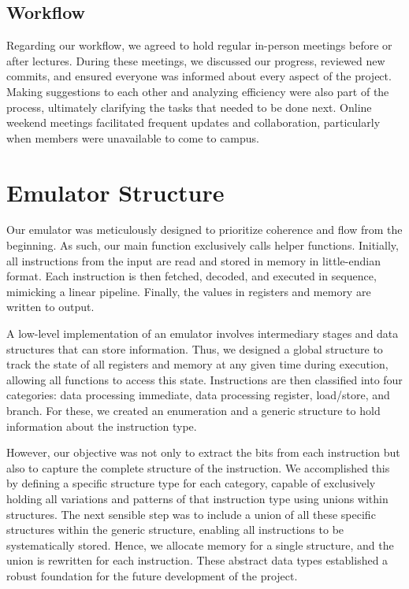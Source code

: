 \documentclass{article}
\begin{document}
\subsection{Workflow}

Regarding our workflow, we agreed to hold regular in-person meetings before or after lectures. During these meetings, we discussed our progress, reviewed new commits, and ensured everyone was informed about every aspect of the project. Making suggestions to each other and analyzing efficiency were also part of the process, ultimately clarifying the tasks that needed to be done next. Online weekend meetings facilitated frequent updates and collaboration, particularly when members were unavailable to come to campus.

\section{Emulator Structure}

Our emulator was meticulously designed to prioritize coherence and flow from the beginning. As such, our main function exclusively calls helper functions. Initially, all instructions from the input are read and stored in memory in little-endian format. Each instruction is then fetched, decoded, and executed in sequence, mimicking a linear pipeline. Finally, the values in registers and memory are written to output.

A low-level implementation of an emulator involves intermediary stages and data structures that can store information. Thus, we designed a global structure to track the state of all registers and memory at any given time during execution, allowing all functions to access this state. Instructions are then classified into four categories: data processing immediate, data processing register, load/store, and branch. For these, we created an enumeration and a generic structure to hold information about the instruction type.

However, our objective was not only to extract the bits from each instruction but also to capture the complete structure of the instruction. We accomplished this by defining a specific structure type for each category, capable of exclusively holding all variations and patterns of that instruction type using unions within structures. The next sensible step was to include a union of all these specific structures within the generic structure, enabling all instructions to be systematically stored. Hence, we allocate memory for a single structure, and the union is rewritten for each instruction. These abstract data types established a robust foundation for the future development of the project.
\end{document}

